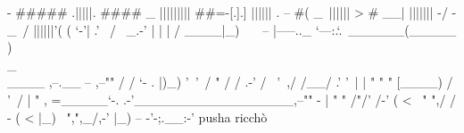                 -      #####       .|||||.
                      ####  \_    |||||||||
                      ##=-[.].]  ||||||  .
                 --   #(    _\   ||||||   >
                       #   __|  ||||||| -/
                -      _\   /   ||||||'(
                      (  `-'|   .'      \
                     / \  \/_.-'    | | |
                    /   \____|_)     \ \ \
              --   |-----.._      `---:.`.\
             ______(_____   )          \\_\\____ ,--.__
  --    ,--""           /  / `-   .     |)_)    '\     '\
       /  "            /  /    .-'     /          \      '\
     ,/               /__/           .'            '\     |
     | "   "   "     [____)         /                '\,  /
     |           " , =_____`-.   .-'_________________,--""
   - |  "    "    /"/'      /\>-' ( <
     \  "      ",/ /    -  ( <    |\_)
      \   ",",_/,-'        |\_)
   -- -'-;.__:-'                    pusha ricchò




